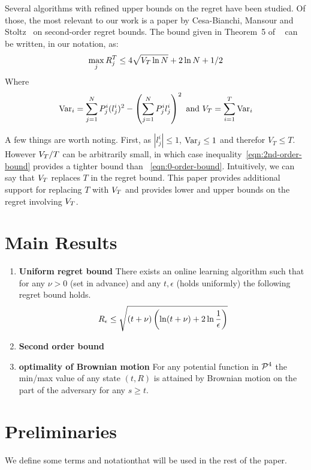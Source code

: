 \documentclass{article}[12pt]
\begin{document}
Several algorithms with refined upper bounds on the regret have been
studied. Of those, the most relevant to our work is a paper by 
Cesa-Bianchi, Mansour and
Stoltz~\cite{cesa2007improved} on second-order regret bounds.
The bound given in Theorem~5 of ~\cite{cesa2007improved} can be
written, in our notation, as:
\begin{equation} \label{eqn:2nd-order-bound}
  \max_j R_j^T \leq 4\sqrt{V_T \ln N} +2 \ln N +1/2 
\end{equation}
Where
\[
  \mbox{Var}_i = \sum_{j=1}^N P^i_j (l_j^i)^2 -  \left( \sum_{j=1}^N P^i_j
    l_j^i \right)^2 \mbox{ and } V_T= \sum_{i=1}^T \mbox{Var}_i
\]

A few things are worth noting. First, as $|l_j^i|\leq 1$,
$\mbox{Var}_j\leq 1$ and therefor $V_T\leq T$. However $V_T/T$ can be
arbitrarily small, in which case inequality~\ref{eqn:2nd-order-bound}
provides a tighter bound than ~\ref{eqn:0-order-bound}. Intuitively,
we can say that $V_T$ replaces $T$ in the regret bound. This paper
provides additional support for replacing $T$ with $V_T$ and provides
lower and upper bounds on the regret involving $V_T$.

\section{Main Results}
\begin{enumerate}
\item {\bf Uniform regret bound} There exists an online learning
  algorithm such that for any $\nu>0$ (set in advance) and any
  $t,\epsilon$ (holds uniformly) the following regret bound holds.
  \begin{equation}
R_\epsilon \leq \sqrt{(t+\nu) \left( \ln (t+\nu) + 2 \ln \frac{1}{\epsilon}\right)}
\end{equation} 
\item {\bf Second order bound}
\item {\bf optimality of Brownian motion} For any potential function
  in ${\cal P}^{4}$ the min/max value of any state $(t,R)$ is attained by
  Brownian motion on the part of the adversary for any $s\geq t$.
\end{enumerate}


\section{Preliminaries} \label{sec:preliminaries}

We define some terms and notationthat will be used in the rest of the paper.
\end{document}
